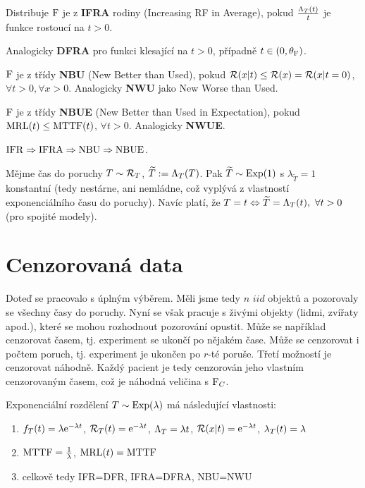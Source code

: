 \begin{define}
	Distribuje $\mathrm{F}$ je z \textbf{IFRA} rodiny (Increasing RF in Average), pokud $\frac{\Lambda_T(t)}{t}$ je funkce rostoucí na $t>0$.
	
	Analogicky \textbf{DFRA} pro funkci klesající na $t>0$, případně $t\in(0,\theta_{\mathrm{F}})$.
\end{define}

\begin{define}
	$\mathrm{F}$ je z třídy \textbf{NBU} (New Better than Used), pokud $\mathcal{R}(x|t)\leq\mathcal{R}(x)=\mathcal{R}(x|t=0)$, $\forall t>0,\forall x>0$. Analogicky \textbf{NWU} jako New Worse than Used.
\end{define}

\begin{define}
		$\mathrm{F}$ je z třídy \textbf{NBUE} (New Better than Used in Expectation), pokud $\mathrm{MRL}(t)\leq \mathrm{MTTF}(t)$, $\forall t>0$. Analogicky \textbf{NWUE}.
\end{define}

\begin{theorem}
	$\mathrm{IFR}\Rightarrow\mathrm{IFRA}\Rightarrow\mathrm{NBU}\Rightarrow\mathrm{NBUE}$.
\end{theorem}

\begin{theorem}
Mějme čas do poruchy $T\sim\mathcal{R}_T$, $\widetilde{T}:=\Lambda_T(T)$. 
Pak $\widetilde{T}\sim\mathrm{Exp}(1)$ s $\lambda_{\widetilde{T}}=1$ 
konstantní (tedy nestárne, ani nemládne, což vyplývá z vlastností 
exponenciálního času do poruchy). Navíc platí, že $T=t\Leftrightarrow 
\widetilde{T}=\Lambda_T(t),~\forall t>0$ (pro spojité modely).
\end{theorem}

\section{Cenzorovaná data}
Doteď se pracovalo s úplným výběrem. Měli jsme tedy $n$ $iid$ objektů 
a pozorovaly se všechny časy do poruchy. Nyní se však pracuje s živými 
objekty (lidmi, zvířaty apod.), které se mohou rozhodnout pozorování 
opustit. Může se například cenzorovat časem, tj. experiment se ukončí 
po nějakém čase. Může se cenzorovat i počtem poruch, tj. experiment je 
ukončen po $r$-té poruše. Třetí možností je cenzorovat náhodně. Každý 
pacient je tedy cenzorován jeho vlastním cenzorovaným časem, což je 
náhodná veličina s $\mathrm{F}_C$.

\begin{example}
	Exponenciální rozdělení $T\sim\mathrm{Exp}(\lambda)$ má následující vlastnosti:\begin{enumerate}
		\item $f_T(t)=\lambda\mathrm{e}^{-\lambda t}$, $\mathcal{R}_T(t)=\mathrm{e}^{-\lambda t}$, $\Lambda_T=\lambda t$, $\mathcal{R}(x|t)=\mathrm{e}^{-\lambda t}$, $\lambda_T(t)=\lambda$
		\item $\mathrm{MTTF}=\frac{1}{\lambda}$, $\mathrm{MRL}(t)=\mathrm{MTTF}$
		\item celkově tedy IFR=DFR, IFRA=DFRA, NBU=NWU
	\end{enumerate}
\end{example}

